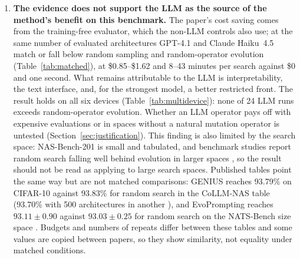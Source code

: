 \documentclass[11pt,a4paper]{article}
\begin{document}
\begin{enumerate}
  \item \textbf{The evidence does not support the LLM as the source of the method's benefit on this benchmark.} The paper's cost saving comes from the training-free evaluator, which the non-LLM controls also use; at the same number of evaluated architectures GPT-4.1 and Claude Haiku~4.5 match or fall below random sampling and random-operator evolution (Table~\ref{tab:matched}), at \$0.85--\$1.62 and 8--43 minutes per search against \$0 and one second. What remains attributable to the LLM is interpretability, the text interface, and, for the strongest model, a better restricted front. The result holds on all six devices (Table~\ref{tab:multidevice}): none of 24 LLM runs exceeds random-operator evolution. Whether an LLM operator pays off with expensive evaluations or in spaces without a natural mutation operator is untested (Section~\ref{sec:justification}). This finding is also limited by the search space: NAS-Bench-201 is small and tabulated, and benchmark studies report random search falling well behind evolution in larger spaces \cite{nats,nb301}, so the result should not be read as applying to large search spaces. Published tables point the same way but are not matched comparisons: GENIUS reaches 93.79\% on CIFAR-10 against 93.83\% for random search in the CoLLM-NAS table \cite{genius,collmnas} (93.70\% with 500 architectures in another \cite{llmtool}), and EvoPrompting reaches $93.11\pm0.90$ against $93.03\pm0.25$ for random search on the NATS-Bench size space \cite{evoprompting}. Budgets and numbers of repeats differ between these tables and some values are copied between papers, so they show similarity, not equality under matched conditions.
\end{enumerate}
\end{document}
